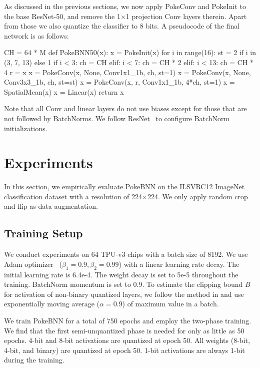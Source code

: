 As discussed in the previous sections, we now apply PokeConv and PokeInit to the base ResNet-50, and remove the 1$\times$1 projection Conv layers therein. Apart from those we also quantize the classifier to 8 bits. A pseudocode of the final network is as follows:

\begin{python}
CH = 64 * M def PokeBNN50(x): x = PokeInit(x) for i in range(16): st = 2 if i in (3, 7, 13) else 1 if i < 3: ch = CH elif: i < 7: ch = CH * 2 elif: i < 13: ch = CH * 4 r = x x = PokeConv(x, None, Conv1x1_1b, ch, st=1) x = PokeConv(x, None, Conv3x3_1b, ch, st=st) x = PokeConv(x, r, Conv1x1_1b, 4*ch, st=1) x = SpatialMean(x) x = Linear(x) return x
\end{python}

Note that all Conv and linear layers do not use biases except for those that are not followed by BatchNorms. We follow ResNet~\cite{He2016resnet} to configure BatchNorm initializations.

\section{Experiments}
\label{sec:experiments}
In this section, we empirically evaluate PokeBNN on the ILSVRC12 ImageNet~\cite{olga2015imagenet} classification dataset with a resolution of 224$\times$224. We only apply random crop and flip as data augmentation. 

\subsection{Training Setup}

We conduct experiments on 64 TPU-v3 chips with a batch size of 8192. We use Adam optimizer~\cite{kingma2017adam} ($\beta_1 = 0.9, \beta_2 = 0.99$) with a linear learning rate decay. The initial learning rate is 6.4e-4. The weight decay is set to 5e-5 throughout the training. BatchNorm momentum is set to 0.9. To estimate the clipping bound $B$ for activation of non-binary quantized layers, we follow the method in \cite{Abdolrashidi2021pareto} and use exponentially moving average ($\alpha=0.9$) of maximum value in a batch.

We train PokeBNN for a total of 750 epochs and employ the two-phase training. We find that the first semi-unquantized phase is needed for only as little as 50  epochs. 4-bit and 8-bit activations are quantized at epoch 50. All weights (8-bit, 4-bit, and binary) are quantized at epoch 50. 1-bit activations are always 1-bit during the training.

